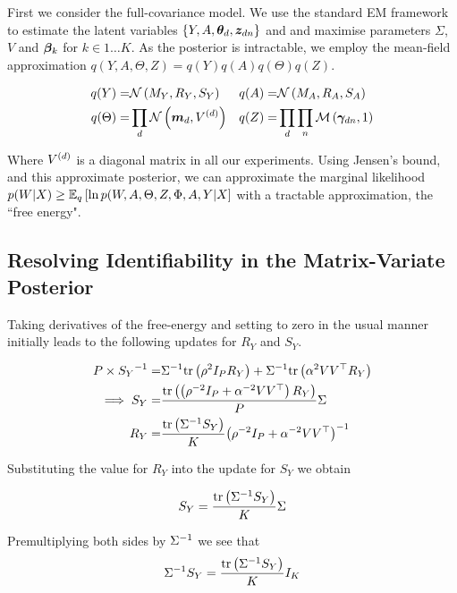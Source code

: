 \newcommand \sigmoid[1] { {  \vv{\sigma}\left( #1 \right)  } }
\newcommand \sigmoidk[1] { {  \sigmoidat{#1}{k}  } }
\newcommand \sigmoidat[2] { {  \sigma_{#2}\left( #1 \right)  } }
\newcommand \ged { { \nabla_{\Ed} } }
\newcommand \gesig { { \ged \left[ \sigmoid{\Ed} \right] } }

First we consider the full-covariance model. We use the standard EM framework to estimate the latent variables $\{Y, A, \thd, \zdn\}$ and and maximise parameters $\Sigma$, $V$ and $\vv{\beta}_k$ for $k \in 1\ldots K$. As the posterior is intractable, we employ the mean-field approximation $q(Y, A, \Theta, Z) = q(Y)q(A)q(\Theta)q(Z)$. 

\begin{align}
q(Y) = & \mnor{M_Y}{R_Y}{S_Y} & q(A) = & \mnor{M_A}{R_A}{S_A} \\ 
q(\Theta) = & \prod_d \nor{\md}{\Vd} & q(Z) = & \prod_d \prod_n \muln{\vv{\gamma}_{dn}}{1} 
\end{align}


Where $\Vd$ is a diagonal matrix in all our experiments. Using Jensen's bound, and this approximate posterior, we can approximate the marginal likelihood $p(W | X) \geq \ex{\ln p(W,A,\Theta,Z,\Phi,A,Y| X}{q}$ with a tractable approximation, the ``free energy".

\subsection{Resolving Identifiability in the Matrix-Variate Posterior}
Taking derivatives of the free-energy and setting to zero in the usual manner initially leads to the following updates for $R_Y$ and $S_Y$.

\begin{align}
P \times \inv{S_Y} = & \inv{\Sigma}\Tr{\rho^2 I_P R_Y} + \inv{\Sigma}\Tr{\alpha^2 V V\T R_Y} \\
\implies S_Y = & \frac{\Tr{\left(\rho^{-2} I_P + \alpha^{-2} V V\T\right) R_Y}}{P} \Sigma \\ 
R_Y = & \frac{\Tr{\inv{\Sigma}S_Y}}{K} \invb{\rho^{-2} I_P + \alpha^{-2} V V\T}\end{align}

Substituting the value for $R_Y$ into the update for $S_Y$ we obtain

\begin{align}
S_Y = \frac{\Tr{\inv{\Sigma}S_Y}}{K} \Sigma
\end{align}

Premultiplying both sides by $\inv{\Sigma}$ we see that
\begin{align}
\inv{\Sigma} S_Y = \frac{\Tr{\inv{\Sigma}S_Y}}{K} I_K
\end{align}

